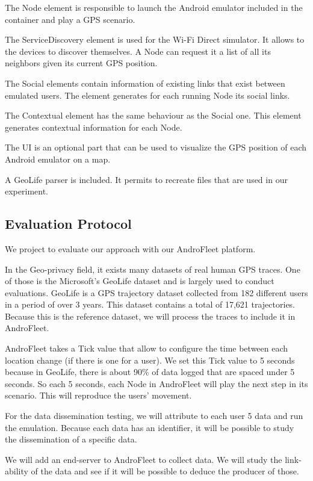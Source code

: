 The Node element is responsible to launch the Android emulator included in the container and play a GPS scenario.

The ServiceDiscovery element is used for the Wi-Fi Direct simulator.
It allows to the devices to discover themselves.
A Node can request it a list of all its neighbors given its current GPS position.

The Social elements contain information of existing links that exist between emulated users.
The element generates for each running Node its social links.

The Contextual element has the same behaviour as the Social one.
This element generates contextual information for each Node.

The UI is an optional part that can be used to visualize the GPS position of each Android emulator on a map.

A GeoLife parser is included.
It permits to recreate files that are used in our experiment.

\subsection{Evaluation Protocol}

We project to evaluate our approach with our AndroFleet platform.

In the Geo-privacy field, it exists many datasets of real human GPS traces.
One of those is the Microsoft’s GeoLife dataset and is largely used to conduct evaluations.
GeoLife is a GPS trajectory dataset collected from 182 different users in a period of over 3 years. 
This dataset contains a total of 17,621 trajectories.
Because this is the reference dataset, we will process the traces to include it in AndroFleet.

AndroFleet takes a Tick value that allow to configure the time between each location change (if there is one for a user).
We set this Tick value to 5 seconds because in GeoLife, there is about 90\% of data logged that are spaced under 5 seconds.
So each 5 seconds, each Node in AndroFleet will play the next step in its scenario.
This will reproduce the users' movement. 

For the data dissemination testing, we will attribute to each user 5 data and run the emulation.
Because each data has an identifier, it will be possible to study the dissemination of a specific data.

We will add an end-server to AndroFleet to collect data.
We will study the link-ability of the data and see if it will be possible to deduce the producer of those.

